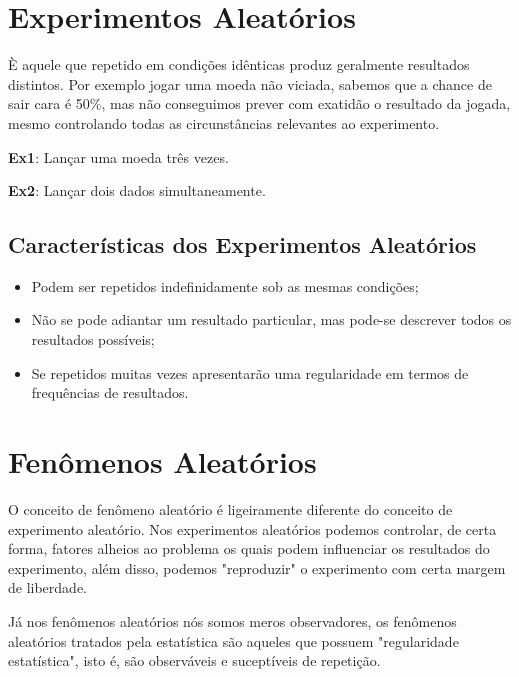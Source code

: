 \documentclass[a4paper,12pt]{report}
\begin{document}
{\section{Experimentos Aleatórios}

È aquele que repetido em condições idênticas produz geralmente
resultados distintos. Por exemplo jogar uma moeda não viciada,
sabemos que a chance de sair cara é 50\%, mas não conseguimos
prever com exatidão o resultado da jogada, mesmo controlando todas
as circunstâncias relevantes ao experimento.\vskip0.3cm


\textbf{Ex1}: Lançar uma moeda três vezes. \vskip0.3cm

\textbf{Ex2}: Lançar dois dados simultaneamente. \vskip0.3cm

\subsection{Características dos Experimentos Aleatórios}


\begin{itemize}
    \item Podem ser repetidos indefinidamente sob as mesmas
   condições;
   \item Não se pode adiantar um resultado particular, mas
    pode-se descrever todos os resultados possíveis;
    \item Se repetidos muitas vezes apresentarão uma regularidade
    em termos de frequências de resultados.
\end{itemize}




\section{Fenômenos Aleatórios}

O conceito de fenômeno aleatório é ligeiramente diferente do
conceito de experimento aleatório. Nos experimentos aleatórios
podemos controlar, de certa forma, fatores alheios ao problema os
quais podem influenciar os resultados do experimento, além disso,
podemos "reproduzir" o experimento com certa margem de
liberdade.\vskip0.3cm

Já nos fenômenos aleatórios nós somos meros observadores, os
fenômenos aleatórios tratados pela estatística são aqueles que
possuem "regularidade estatística", isto é, são observáveis e
suceptíveis de repetição.\vskip0.3cm

}
\end{document}
